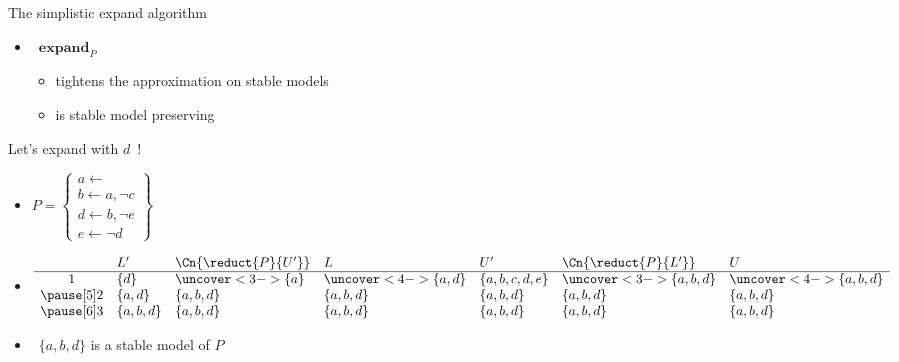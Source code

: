 \begin{frame}{The simplistic expand algorithm}
  \bigskip
  \begin{itemize}
  \item {} \ $\mathbf{expand}_{P}$
    \smallskip
    \begin{itemize}\normalsize
  \item tightens the approximation on stable models
    \smallskip
  \item is stable model preserving
  \end{itemize}
\end{itemize}
\end{frame}
\begin{frame}{Let's expand with $d$~!}
  \begin{itemize}
  \item<1-> []
    \(
      P
      =
      \left\{
        \begin{array}{l}
          a\leftarrow\\  b\leftarrow a,\neg c\\ d\leftarrow b,\neg e\\ e\leftarrow\neg d
        \end{array}
      \right\}
    \)
  \item<2-> []
    \[
      \begin{array}{cllllll}
        & L'          & \Cn{\reduct{P}{U'}}   & L                     & U'                 & \Cn{\reduct{P}{L'}}   & U                     \\
        \hline
        1 & \{d\}     &\uncover<3->{\{a    \}}&\uncover<4->{\{a,  d\}}& \{a,b,c,d,e\}      &\uncover<3->{\{a,b,d\}}&\uncover<4->{\{a,b,d\}}\\\pause[5]
        2 & \{a,d\}   &             \{a,b,d\} &             \{a,b,d\} & \{a,b,d\}          &             \{a,b,d\} &             \{a,b,d\} \\\pause[6]
        3 & \{a,b,d\} &             \{a,b,d\} &             \{a,b,d\} & \{a,b,d\}          &             \{a,b,d\} &             \{a,b,d\}
      \end{array}
    \]
    \medskip
  \item<7->  \ $\{a,b,d\}$ is a stable model of $P$
  \end{itemize}
\end{frame}
